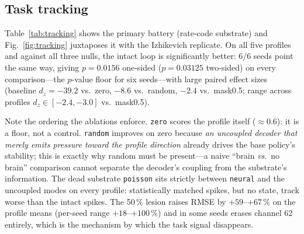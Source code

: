 \subsection{Task tracking}
\label{sec:resA}

Table~\ref{tab:tracking} shows the primary battery (rate-code substrate) and
Fig.~\ref{fig:tracking} juxtaposes it with the Izhikevich replicate. On all five
profiles and against all three nulls, the intact loop is significantly better:
6/6 seeds point the same way, giving $p=0.0156$ one-sided
($p=0.03125$ two-sided) on every comparison---the $p$-value floor for six
seeds---with large paired effect sizes (baseline $d_z=-39.2$ vs.\ zero,
$-8.6$ vs.\ random, $-2.4$ vs.\ mask0.5; range across profiles
$d_z\in[-2.4,-3.0]$ vs.\ mask0.5).

Note the ordering the ablations enforce. \texttt{zero} scores the profile itself
($\approx 0.6$): it is a floor, not a control. \texttt{random} improves on zero
because \emph{an uncoupled decoder that merely emits pressure toward the
profile direction} already drives the base policy's stability; this is exactly
why random must be present---a naive ``brain \emph{vs}.\ no brain'' comparison
cannot separate the decoder's coupling from the substrate's information. The
dead substrate \texttt{poisson} sits strictly between \texttt{neural} and the
uncoupled modes on every profile: statistically matched spikes, but no state,
track worse than the intact spikes. The 50\,\% lesion raises RMSE by
$+59$--$+67\,\%$ on the profile means (per-seed range $+18$--$+100\,\%$) and in
some seeds erases channel 62 entirely, which is the mechanism by which the task
signal disappears.

